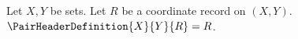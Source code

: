 

\begin{definition}\label{pair_header_definition}
    Let $X,Y$ be sets.
    Let $R$ be a coordinate record on $(X,Y)$.
    $\PairHeaderDefinition{X}{Y}{R}=R$.
\end{definition}
